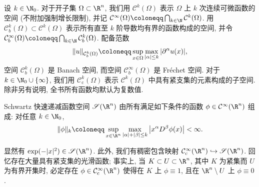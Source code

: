 设 $k \in \N_0$. 对于开子集 $\Omega \subset \R^n$, 我们用 $\mathcal{C}^k(\Omega)$ 表示 $\Omega$ 上 $k$ 次连续可微函数的空间 (不附加强制增长限制), 并记 $\mathcal{C}^\infty(\Omega) \defeq \bigcap_{k \in \N} \mathcal{C}^k(\Omega)$. 用 $\mathcal{C}_b^k(\Omega) \subset \mathcal{C}^k(\Omega)$ 表示所有直至 $k$ 阶导数均有界的函数构成的空间, 并令 $\mathcal{C}_b^\infty(\Omega) \defeq \bigcap_{k \in \N} \mathcal{C}_b^k(\Omega)$. 配备范数
\begin{equation}\label{eq:2.5}
    \|u\|_{\mathcal{C}_b^k(\Omega)} \defeq \sup_{x \in \Omega} \max_{|\alpha| \le k} |\partial^\alpha u(x)|,
\end{equation}
空间 $\mathcal{C}_b^k(\Omega)$ 是 Banach 空间, 而空间 $\mathcal{C}_b^\infty(\Omega)$ 是 Fréchet 空间. 对于 $k \in \N_0 \cup \{\infty\}$, 我们用 $\mathcal{C}_{\mathrm{c}}^k(\Omega)$ 表示 $\mathcal{C}^k(\Omega)$ 中具有紧支集的元素构成的子空间. 除非另有说明, 全书所有函数均默认为复数值.

\begin{definition}[Schwartz 空间]\label{def:2.1}
Schwartz 快速递减函数空间 $\Schwartz(\R^n)$ 由所有满足如下条件的函数 $\phi \in \Smooth(\R^n)$ 组成: 对任意 $k \in \N_0$,
\begin{equation}\label{eq:2.6}
    \|\phi\|_k \defeq \sup_{x \in \R^n} \max_{|\alpha| + |\beta| \le k} \left| x^\alpha D^\beta \phi(x) \right| < \infty.
\end{equation}
\end{definition}

\begin{example}[Schwartz 函数]\label{eg:2.2}
显然有 $\exp(-|x|^2) \in \Schwartz(\R^n)$. 此外, 我们有稠密包含映射 $\SmoothComp(\R^n) \hookrightarrow \Schwartz(\R^n)$. 回忆存在大量具有紧支集的光滑函数; 事实上, 当 $K \subset U \subset \R^n$, 其中 $K$ 为紧集而 $U$ 为有界开集时, 必定存在 $\phi \in \SmoothComp(\R^n)$ 使得在 $K$ 上 $\phi \equiv 1$, 且在 $\R^n \setminus U$ 上 $\phi \equiv 0$.
\end{example}

